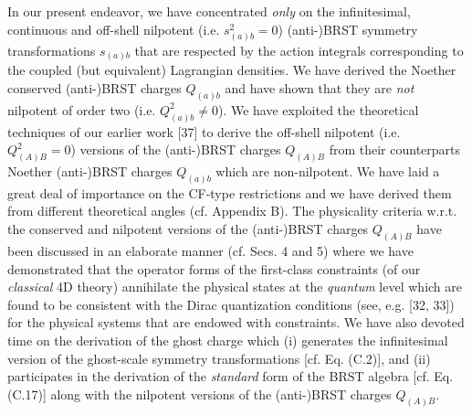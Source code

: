 \documentclass[12pt]{article}
\begin{document}
In our present endeavor, we have concentrated {\it only} on the infinitesimal, continuous and off-shell nilpotent 
(i.e. $s_{(a)b}^2 = 0 $) (anti-)BRST symmetry transformations $s_{(a)b}$ that are
respected by the action integrals corresponding to the 
coupled (but equivalent) Lagrangian densities. We have derived the Noether  conserved (anti-)BRST charges 
$Q_{(a)b}$ and have shown that they are
{\it not} nilpotent of order two (i.e. $Q_{(a)b}^2 \neq 0$). We have exploited the theoretical techniques of our earlier work [37]
to derive the off-shell nilpotent (i.e. $Q_{(A)B}^2 = 0$) versions of the (anti-)BRST charges $Q_{(A)B} $ from their
counterparts Noether (anti-)BRST charges $Q_{(a)b}$ which are non-nilpotent. We have laid a great deal of importance on 
the CF-type restrictions and we have derived them from different theoretical angles
(cf. Appendix B). The physicality criteria w.r.t. the conserved and 
nilpotent versions of the (anti-)BRST charges $Q_{(A)B} $ have been discussed in an elaborate manner 
(cf. Secs. 4 and 5) where we have demonstrated that the operator
forms of the first-class constraints (of our {\it classical} 4D theory) annihilate the physical states at the {\it quantum} level which are found
to be consistent with the Dirac quantization conditions (see, e.g. [32, 33]) for the physical systems that are endowed with constraints. We have also
devoted time on the derivation of the ghost charge which (i) generates the infinitesimal version of the  ghost-scale symmetry transformations
[cf. Eq. (C.2)], and (ii) participates in the derivation of the {\it standard}  form of the BRST algebra [cf. Eq. (C.17)]
along with the nilpotent versions of the 
(anti-)BRST charges $Q_{(A)B} $.
\end{document}
